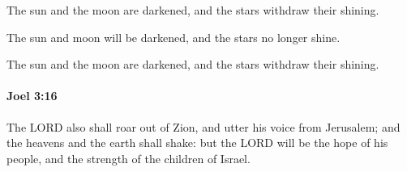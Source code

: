 			\begin{versebox}
					\item[BHS] 
					\item[LXX] 
					\item[ASV] The sun and the moon are darkened, and the stars withdraw their shining.
					\item[NIV] The sun and moon will be darkened, and the stars no longer shine.
					\item[NRSV] The sun and the moon are darkened, and the stars withdraw their shining.
			\end{versebox}

		\paragraph{Joel 3:16} %
			\label{JOEL-3-16}

			The LORD also shall roar out of Zion, and utter his voice from Jerusalem; and the heavens and the earth shall shake: but the LORD will be the hope of his people, and the strength of the children of Israel.

